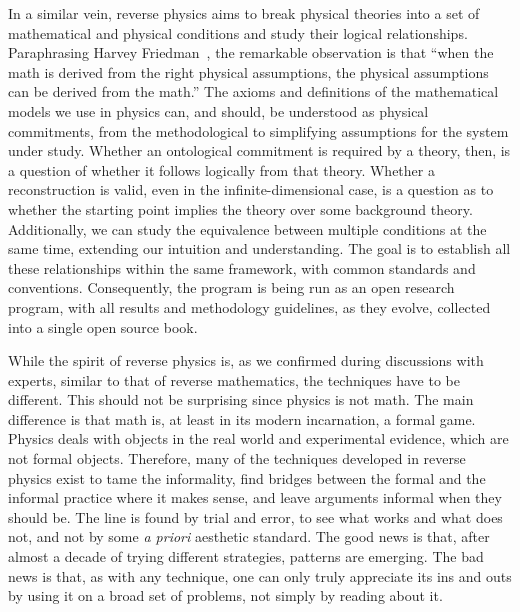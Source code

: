 \documentclass[entropy,article,submit,moreauthors]{Definitions/mdpi}
\begin{document}
In a similar vein, reverse physics aims to break physical theories into a set of mathematical and physical conditions and study their logical relationships.  Paraphrasing Harvey Friedman~\cite{Stillwell2018}, the remarkable observation is that ``when the math is derived from the right physical assumptions, the physical assumptions can be derived from the math.'' The axioms and definitions of the mathematical models we use in physics can, and should, be understood as physical commitments, from the methodological to simplifying assumptions for the system under study. Whether an ontological commitment is required by a theory, then, is a question of whether it follows logically from that theory. Whether a reconstruction is valid, even in the infinite-dimensional case, is a question as to whether the starting point implies the theory over some background theory. Additionally, we can study the equivalence between multiple conditions at the same time, extending our intuition and understanding. The goal is to establish all these relationships within the same framework, with common standards and conventions. Consequently, the program is being run as an open research program, with all results and methodology guidelines, as they evolve, collected into a single open source book.

While the spirit of reverse physics is, as we confirmed during discussions with experts, similar to that of reverse mathematics, the techniques have to be different. This should not be surprising since physics is not math. The main difference is that math is, at least in its modern incarnation, a formal game. Physics deals with objects in the real world and experimental evidence, which are not formal objects. Therefore, many of the techniques developed in reverse physics exist to tame the informality, find bridges between the formal and the informal practice where it makes sense, and leave arguments informal when they should be. The line is found by trial and error, to see what works and what does not, and not by some \textit{a priori} aesthetic standard. The good news is that, after almost a decade of trying different strategies, patterns are emerging. The bad news is that, as with any technique, one can only truly appreciate its ins and outs by using it on a broad set of problems, not simply by reading about it.
\end{document}

